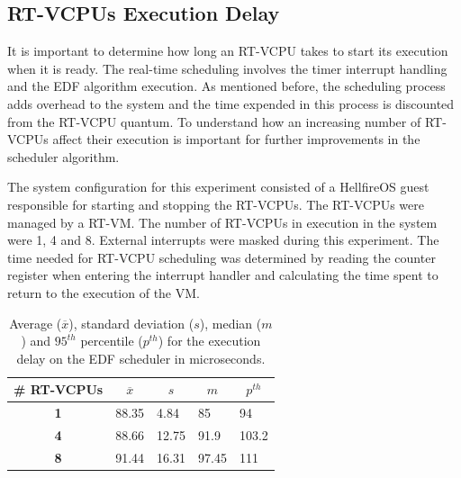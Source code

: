 \subsection{RT-VCPUs Execution Delay}
\label{subsection:rtdelay}

It is important to determine how long an RT-VCPU takes to start its execution when it is ready. The real-time scheduling involves the timer interrupt handling and the EDF algorithm execution. As mentioned before, the scheduling process adds overhead to the system and the time expended in this process is discounted from the RT-VCPU quantum. To understand how an increasing number of RT-VCPUs affect their execution is important for further improvements in the scheduler algorithm. 

The system configuration for this experiment consisted of a HellfireOS guest responsible for starting and stopping the RT-VCPUs. The RT-VCPUs were managed by a RT-VM. The number of RT-VCPUs in execution in the system were 1, 4 and 8. External interrupts were masked during this experiment. The time needed for RT-VCPU scheduling was determined by reading the counter register when entering  the interrupt handler and calculating the time spent to return to the execution of the VM.

\begin{table}[!hbtp]
\centering
\caption{Average ($\overline{x}$), standard deviation ($s$), median ($m$) and $95^{th}$ percentile ($p^{th}$) for the execution delay on the EDF scheduler in microseconds.}
\label{table:rtdelay}
\begin{tabular}{cllll}
\hline \hline
\textbf{\# RT-VCPUs} & \multicolumn{1}{c}{\textbf{$\overline{x}$}} & \multicolumn{1}{c}{\textbf{$s$}} & \multicolumn{1}{c}{\textbf{$m$}} & \multicolumn{1}{c}{\textbf{$p^{th}$}} \\ \hline
\textbf{1}  & 88.35                          & 4.84                           & 85                             & 94                             \\
\textbf{4}  & 88.66                          & 12.75                          & 91.9                           & 103.2                          \\
\textbf{8}  & 91.44                          & 16.31                          & 97.45                          & 111                            \\ \hline
\end{tabular}
\end{table}


